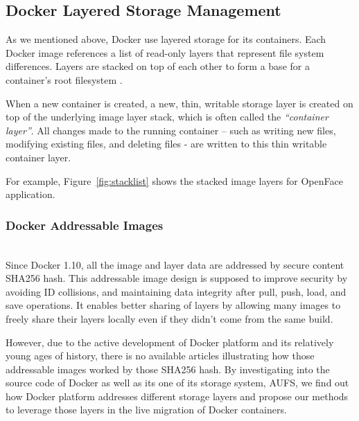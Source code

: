 
\subsection{Docker Layered Storage Management}\label{aufsIntroduction}

As we mentioned above, Docker use layered storage for its containers. Each Docker image references a list of read-only layers that represent file system differences. Layers are stacked on top of each other to form a base for a container’s root filesystem \cite{dockerlayer}. 


When a new container is created, a new, thin, writable storage layer is created on top of the underlying image layer stack, which is often called the \textit{``container layer''}. All changes made to the running container -- such as writing new files, modifying existing files, and deleting files - are written to this thin writable container layer\cite{dockerlayer}.

For example, 
Figure~\ref{fig:stacklist} shows the stacked image layers for OpenFace application.




\subsubsection{Docker Addressable Images}~\\
Since Docker 1.10, all the image and layer data are addressed by secure content SHA256 hash. 
This addressable image design is supposed to improve security by avoiding ID collisions, and maintaining data integrity after pull, push, load, and save operations. It enables better sharing of layers by allowing many images to freely share their layers locally even if they didn’t come from the same build\cite{dockerlayer}. 

However, due to the active development of Docker platform and its relatively young ages of history, there is no available articles illustrating how those addressable images worked by those SHA256 hash. 
By investigating into the source code of Docker as well as its one of its storage system, AUFS, we find out how Docker platform addresses different storage layers and propose our methods to leverage those layers in the live migration of Docker containers.


